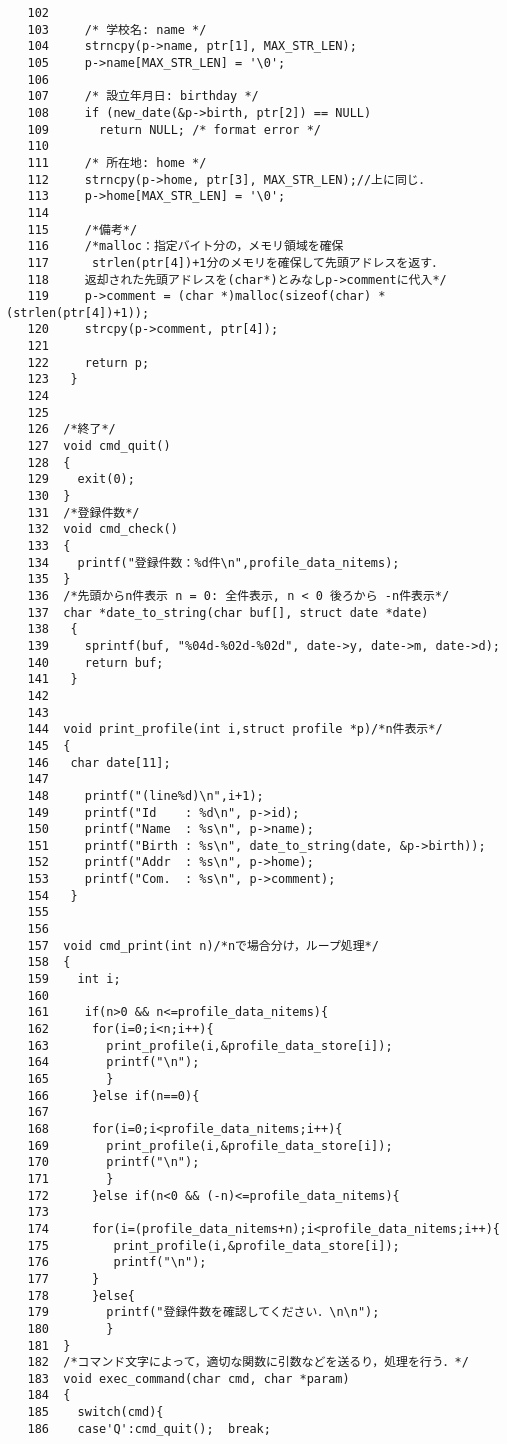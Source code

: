 \documentclass[a4j]{jarticle}
\begin{document}
{\begin{verbatim}
   102	 
   103	   /* 学校名: name */
   104	   strncpy(p->name, ptr[1], MAX_STR_LEN);  
   105	   p->name[MAX_STR_LEN] = '\0';
   106	 
   107	   /* 設立年月日: birthday */
   108	   if (new_date(&p->birth, ptr[2]) == NULL)
   109	     return NULL; /* format error */
   110	 
   111	   /* 所在地: home */
   112	   strncpy(p->home, ptr[3], MAX_STR_LEN);//上に同じ．  
   113	   p->home[MAX_STR_LEN] = '\0';
   114	 
   115	   /*備考*/
   116	   /*malloc：指定バイト分の，メモリ領域を確保
   117	    strlen(ptr[4])+1分のメモリを確保して先頭アドレスを返す．
   118	   返却された先頭アドレスを(char*)とみなしp->commentに代入*/
   119	   p->comment = (char *)malloc(sizeof(char) * (strlen(ptr[4])+1));
   120	   strcpy(p->comment, ptr[4]);
   121	 
   122	   return p;
   123	 }
   124	
   125	
   126	/*終了*/
   127	void cmd_quit()
   128	{
   129	  exit(0); 
   130	}
   131	/*登録件数*/
   132	void cmd_check()
   133	{
   134	  printf("登録件数：%d件\n",profile_data_nitems);
   135	}
   136	/*先頭からn件表示 n = 0: 全件表示, n < 0 後ろから -n件表示*/
   137	char *date_to_string(char buf[], struct date *date)
   138	 {
   139	   sprintf(buf, "%04d-%02d-%02d", date->y, date->m, date->d);
   140	   return buf;
   141	 }
   142	
   143	
   144	void print_profile(int i,struct profile *p)/*n件表示*/
   145	{
   146	 char date[11];
   147	
   148	   printf("(line%d)\n",i+1);
   149	   printf("Id    : %d\n", p->id);
   150	   printf("Name  : %s\n", p->name);
   151	   printf("Birth : %s\n", date_to_string(date, &p->birth));
   152	   printf("Addr  : %s\n", p->home);
   153	   printf("Com.  : %s\n", p->comment);
   154	 }
   155	
   156	
   157	void cmd_print(int n)/*nで場合分け，ループ処理*/
   158	{
   159	  int i;
   160	  
   161	   if(n>0 && n<=profile_data_nitems){
   162	    for(i=0;i<n;i++){
   163	      print_profile(i,&profile_data_store[i]);
   164	      printf("\n");
   165	      }
   166	    }else if(n==0){
   167	
   168	    for(i=0;i<profile_data_nitems;i++){
   169	      print_profile(i,&profile_data_store[i]);
   170	      printf("\n");
   171	      }
   172	    }else if(n<0 && (-n)<=profile_data_nitems){
   173	    
   174	    for(i=(profile_data_nitems+n);i<profile_data_nitems;i++){
   175	       print_profile(i,&profile_data_store[i]);
   176	       printf("\n");
   177		}
   178	    }else{
   179	      printf("登録件数を確認してください．\n\n");
   180	      }
   181	}
   182	/*コマンド文字によって，適切な関数に引数などを送るり，処理を行う．*/
   183	void exec_command(char cmd, char *param)
   184	{
   185	  switch(cmd){
   186	  case'Q':cmd_quit();  break;

\end{verbatim}}
\end{document}

